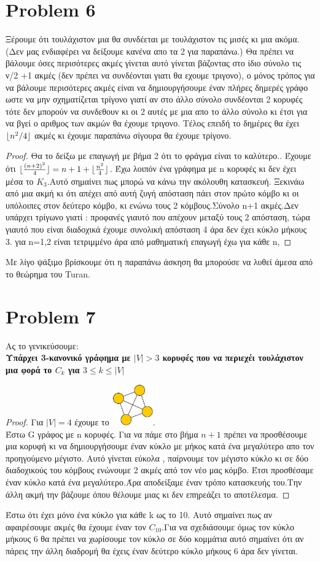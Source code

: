 \documentclass{article}
\DeclarePairedDelimiter\floor{\lfloor}{\rfloor}
\begin{document}
\section*{Problem 6}
 Ξέρουμε ότι τουλάχιστον μια θα συνδέεται με τουλάχιστον τις μισές κι μια ακόμα. (Δεν μας ενδιαφέρει να δείξουμε κανένα απο τα 2 για παραπάνω.)
	Θα πρέπει να βάλουμε όσες περισότερες ακμές γίνεται αυτό γίνεται βάζοντας στο ίδιο σύνολο τις ν/2 +1 ακμές (δεν πρέπει να συνδέονται γιατι θα εχουμε τριγονο), ο μόνος τρόπος για να βάλουμε περισότερες ακμές είναι να δημιουργήσουμε έναν πλήρες δημερές γράφο ωστε να μην σχηματίζεται τρίγονο γιατί αν στο άλλο σύνολο συνδέονται 2 κορυφές τότε δεν μπορούν να συνδεθουν κι οι 2 αυτές με μια απο το άλλο σύνολο κι έτσι για να βγεί ο αριθμος των ακμών θα έχουμε τριγονο. Τέλος επειδή το δημέρες θα έχει $\floor{n^2/4}$ ακμές κι έχουμε παραπάνω σίγουρα θα έχουμε τρίγονο.  
\begin{proof}
Θα το δείξω με επαγωγή με βήμα 2 ότι το φράγμα είναι το καλύτερο.. Έχουμε ότι $\floor {\frac{(n+2)^2}{4}} = n+1 +\floor {\frac{n^2}{4}} $. Έχω λοιπόν ένα γράφημα με n κορυφές κι δεν έχει μέσα το $K_3$.Αυτό σημαίνει πως μπορώ να κάνω την ακόλουθη κατασκευή. Ξεκινάω από μια ακμή κι ότι απέχει από αυτή ζυγή απόσταση πάει στον πρώτο κόμβο κι οι υπόλοιπες στον δεύτερο κόμβο, κι ενώνω τους 2 κόμβους.Σύνολο n+1 ακμές.Δεν υπάρχει τρίγωνο γιατί : προφανές γιαυτό που απέχουν μεταξύ τους 2 απόσταση, τώρα γιαυτό που είναι διαδοχικά έχουμε συνολική απόσταση 4 άρα δεν έχει κύκλο μήκους 3. για n=1,2 είναι τετριμμένο άρα από μαθηματική επαγωγή έχω για κάθε n,
\end{proof}
Με λίγο ψάξιμο βρίσκουμε ότι η παραπάνω άσκηση θα μπορούσε να λυθεί άμεσα από το θεώρημα του Turan.
\section*{Problem 7}
Ας το γενικεύσουμε:\\ \textbf{Υπάρχει 3-κανονικό γράφημα με $|V|>3$ κορυφές που να περιεχέι τουλάχιστον μια φορά το $C_k$ για $3\le k\le |V|$} 
\begin{proof}
	Για $|V|=4$ έχουμε το \includegraphics[height=50pt,width=50pt]{ex7}.\\
	Έστω G  γράφος με n κορυφές. Για να πάμε στο βήμα $n+1$ πρέπει να προσθέσουμε μια κορυφή κι να δημιουργήσουμε έναν κύκλο με μήκος κατά ένα μεγαλύτερο απο τον προηγούμενο μέγιστο. Αυτό γίνεται εύκολα , παίρνουμε τον μέγιστο κύκλο κι σε δύο διαδοχικούς του κόμβους ενώνουμε 2 ακμές από τον νέο μας κόμβο. Έτσι προσθέσαμε έναν κύκλο κατά ένα μεγαλύτερο.Άρα αποδείξαμε έναν τρόπο κατασκευής του.Την άλλη ακμή την βάζουμε όπου θέλουμε μιας κι δεν επηρεάζει το αποτέλεσμα.
	\end{proof}
Έστω ότι έχει μόνο ένα κύκλο για κάθε k ως το 10. Αυτό σημαίνει πως αν αφαιρέσουμε ακμές θα έχουμε έναν τον $C_{10}$.Για να σχεδιάσουμε όμως τον κύκλο μήκους 6 θα πρέπει να χωρίσουμε τον κύκλο σε δύο κομμάτια αυτό σημαίνει ότι αν πάρεις την άλλη διαδρομή θα έχεις έναν δεύτερο κύκλο μήκους 6 άρα δεν γίνεται. 
\end{document}

